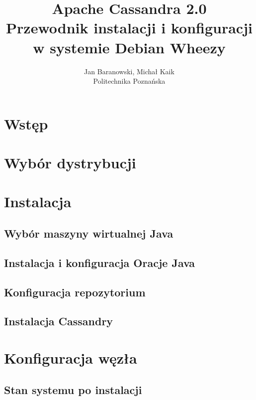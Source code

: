 \documentclass{article}
\begin{document}
\title{Apache Cassandra 2.0\\\vspace{2ex}Przewodnik instalacji i konfiguracji w systemie Debian Wheezy}
\author{Jan Baranowski, Michał Kaik\\Politechnika Poznańska}
\maketitle

\section{Wstęp}

\section{Wybór dystrybucji}

\section{Instalacja}

\subsection{Wybór maszyny wirtualnej Java}

\subsection{Instalacja i konfiguracja Oracje Java}

\subsection{Konfiguracja repozytorium}

\subsection{Instalacja Cassandry}

\section{Konfiguracja węzła}

\subsection{Stan systemu po instalacji}
\end{document}
